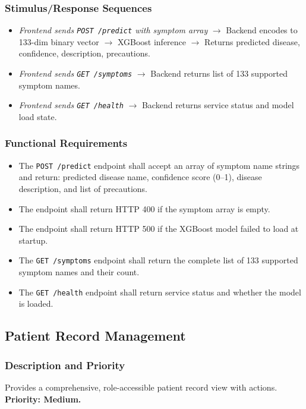 \documentclass[12pt,a4paper]{article}
\begin{document}
\subsubsection{Stimulus/Response Sequences}
\begin{itemize}
    \item \textit{Frontend sends \texttt{POST /predict} with symptom array} $\rightarrow$ Backend encodes to 133-dim binary vector $\rightarrow$ XGBoost inference $\rightarrow$ Returns predicted disease, confidence, description, precautions.
    \item \textit{Frontend sends \texttt{GET /symptoms}} $\rightarrow$ Backend returns list of 133 supported symptom names.
    \item \textit{Frontend sends \texttt{GET /health}} $\rightarrow$ Backend returns service status and model load state.
\end{itemize}

\subsubsection{Functional Requirements}
\begin{itemize}
    \item[\texttt{REQ-AI-01}] The \texttt{POST /predict} endpoint shall accept an array of symptom name strings and return: predicted disease name, confidence score (0--1), disease description, and list of precautions.
    \item[\texttt{REQ-AI-02}] The endpoint shall return HTTP 400 if the symptom array is empty.
    \item[\texttt{REQ-AI-03}] The endpoint shall return HTTP 500 if the XGBoost model failed to load at startup.
    \item[\texttt{REQ-AI-04}] The \texttt{GET /symptoms} endpoint shall return the complete list of 133 supported symptom names and their count.
    \item[\texttt{REQ-AI-05}] The \texttt{GET /health} endpoint shall return service status and whether the model is loaded.
\end{itemize}

\subsection{Patient Record Management}

\subsubsection{Description and Priority}
Provides a comprehensive, role-accessible patient record view with actions. \textbf{Priority: Medium.}
\end{document}
